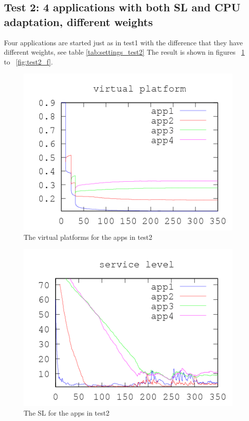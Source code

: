 \documentclass[nobiblatex]{LTHthesis}
\begin{document}
\subsection{Test 2: 4 applications with both SL and CPU adaptation, different weights}

Four applications are started just as in test1 with the difference that they have different weights, see table \ref{tab:settings_test2}
The result is shown in figures ~\ref{fig:test2_vp} to ~\ref{fig:test2_f}. 
\begin{figure}[!H]
  \centering
  \includegraphics{"tools/plot/logs/test2/vp"}
  \caption{The virtual platforms for the apps in test2}
  \label{fig:test2_vp}
\end{figure}

\begin{figure}[!H]
  \centering
  \includegraphics{"tools/plot/logs/test2/sl"}
  \caption{The SL for the apps in test2}
  \label{fig:test2_sl}
\end{figure}
\end{document}
